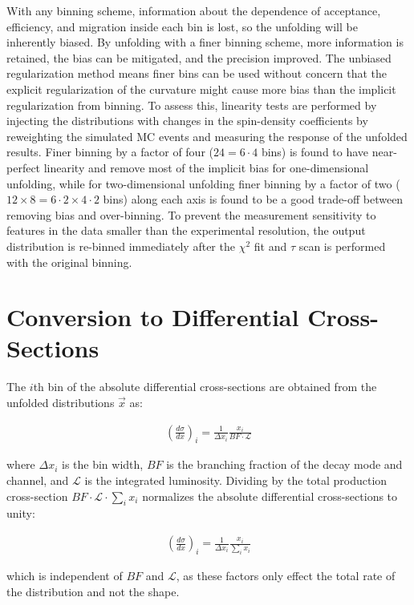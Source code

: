 With any binning scheme, information about the dependence of acceptance, efficiency, and migration inside each bin is lost, so the unfolding will be inherently biased.
By unfolding with a finer binning scheme, more information is retained, the bias can be mitigated, and the precision improved.
The unbiased regularization method means finer bins can be used without concern that the explicit regularization of the curvature might cause more bias than the implicit regularization from binning.
To assess this, linearity tests are performed by injecting the distributions with changes in the spin-density coefficients by reweighting the simulated MC events and measuring the response of the unfolded results.
Finer binning by a factor of four ($24 = 6 \cdot 4$ bins) is found to have near-perfect linearity and remove most of the implicit bias for one-dimensional unfolding, while for two-dimensional unfolding finer binning by a factor of two ($12 \times 8 = 6 \cdot 2 \times 4 \cdot 2$ bins) along each axis is found to be a good trade-off between removing bias and over-binning.
To prevent the measurement sensitivity to features in the data smaller than the experimental resolution, the output distribution is re-binned immediately after the $\chi^2$ fit and $\tau$ scan is performed with the original binning.

\section{Conversion to Differential Cross-Sections}
The $i$th bin of the absolute differential cross-sections are obtained from the unfolded distributions $\vec{x}$ as:
\begin{linenomath*}
\begin{align}
(\frac{d\sigma}{dx})_i = \frac{1}{\Delta x_i} \frac{x_i}{BF \cdot \mathcal{L}} 
\end{align}
\end{linenomath*}
where $\Delta x_i$ is the bin width, $BF$ is the branching fraction of the \ttbar decay mode and channel, and $\mathcal{L}$ is the integrated luminosity.
Dividing by the total \ttbar production cross-section $BF \cdot \mathcal{L} \cdot \sum_i x_i$ normalizes the absolute differential cross-sections to unity:
\begin{linenomath*}
\begin{align}
(\frac{d\sigma}{dx})_i = \frac{1}{\Delta x_i} \frac{x_i}{\sum_i x_i} 
\end{align}
\end{linenomath*}
which is independent of $BF$ and $\mathcal{L}$, as these factors only effect the total rate of the distribution and not the shape.



